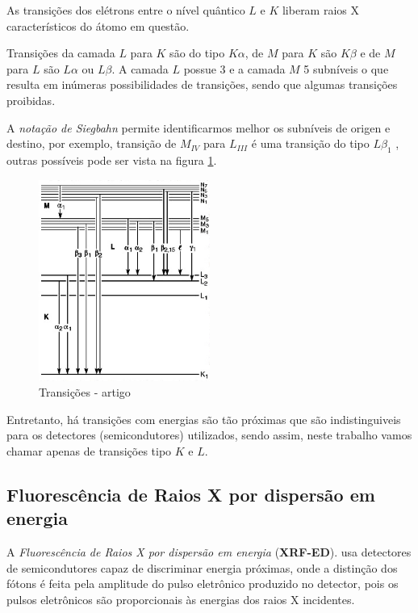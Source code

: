 As transições dos elétrons entre o nível quântico $L$ e
$K$ liberam raios X característicos do átomo em questão. 

Transições da camada $L$ para $K$ são do tipo $K\alpha$, de $M$ para $K$ 
são $K\beta$ e de $M$ para $L$ são $L\alpha$ ou $L\beta$. 
A camada $L$ possue 3 e a camada $M$ 5 subníveis o que
resulta em inúmeras possibilidades de transições, sendo que algumas transições
proibidas. 

A \textit{notação de Siegbahn} permite identificarmos melhor os subníveis
de origen e destino, por exemplo, transição de $M_{IV}$ para $L_{III}$ é uma transição do 
tipo $L\beta_1$ \cite{jenkins1991}, outras possíveis pode ser vista na
figura \ref{fig:siegbahn}. 

\begin{figure}[H]
\begin{center} 
  \includegraphics[width=0.5\textwidth]{../inputs/images/Siegbahn.jpg}
  \caption{Transições - artigo \cite{jenkins1991}  \label{fig:siegbahn}}
\end{center}
\end{figure}

Entretanto, há transições com energias são tão próximas 
que são indistinguiveis para os detectores (semicondutores) 
utilizados, sendo assim, neste trabalho vamos chamar apenas de 
transições tipo $K$ e $L$.

\subsection{Fluorescência de Raios X por dispersão em energia}

A \textit{Fluorescência de Raios X por dispersão em energia} (\textbf{XRF-ED}).
usa detectores de semicondutores capaz de discriminar energia 
próximas, onde a distinção dos fótons é feita pela amplitude do pulso 
eletrônico produzido no detector, pois os pulsos eletrônicos são
proporcionais às energias dos raios X incidentes. 

